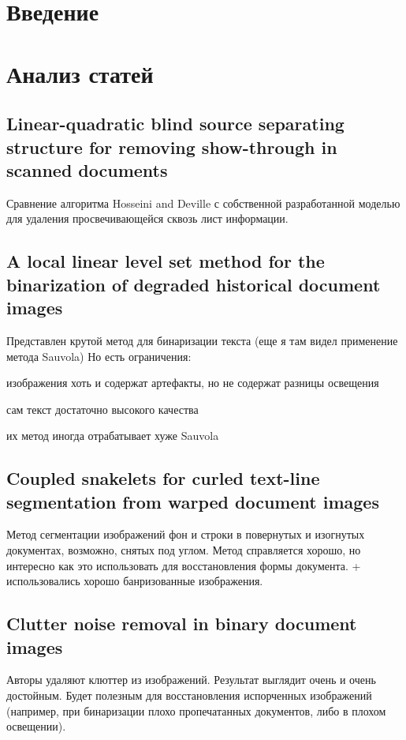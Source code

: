 \documentclass[12pt]{article}
\begin{document}
\section*{Введение}

\section{Анализ статей}

\subsection{Linear-quadratic blind source separating structure for removing show-through in scanned documents}
Сравнение алгоритма Hosseini and Deville с собственной разработанной моделью
для удаления просвечивающейся сквозь лист информации.


\subsection{A local linear level set method for the binarization of degraded historical document images}
Представлен крутой метод для бинаризации текста (еще я там видел применение метода Sauvola) Но есть ограничения:
\begin{list}{}{}
    \item изображения хоть и содержат артефакты, но не содержат разницы освещения
    \item сам текст достаточно высокого качества
    \item их метод иногда отрабатывает хуже Sauvola
\end{list}


\subsection{Coupled snakelets for curled text-line segmentation from warped document images}
Метод сегментации изображений фон и строки в повернутых и изогнутых документах, возможно, снятых под углом.
Метод справляется хорошо, но интересно как это использовать для восстановления формы документа. + использовались
хорошо банризованные изображения.


\subsection{Clutter noise removal in binary document images}
Авторы удаляют клюттер из изображений. Результат выглядит очень и очень достойным. Будет полезным для восстановления
испорченных изображений (например, при бинаризации плохо пропечатанных документов, либо в плохом освещении).
\end{document}
